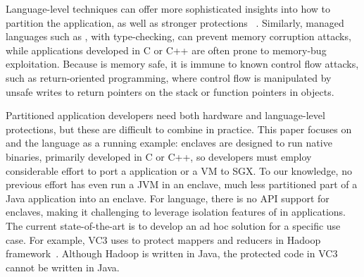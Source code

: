 Language-level techniques can offer more sophisticated insights into how
to partition the application, as well as stronger protections ~\cite{bittau2008wedge,brumley2004privtrans,khatiwala2006data}.
Similarly, managed languages such as \java{}, with type-checking,
can prevent memory corruption attacks,
while applications developed in C or C++ are often prone to memory-bug exploitation.  
Because \java{} is memory safe, it is immune to known control flow attacks, such as return-oriented programming,
where control flow is manipulated by unsafe writes to return pointers on the stack or function pointers in objects.


Partitioned application developers need both hardware and language-level protections,
but these are difficult to combine in practice.
This paper focuses on \sgx{} and the \java{} language as a running example:
\sgx{} enclaves are designed to run native binaries, primarily developed in C or C++,
so developers must employ considerable effort to port a \java{} application or a \java{} VM to SGX.
To our knowledge, no previous effort has even run a JVM in an enclave, much less partitioned part of a Java application into an enclave.
For \java{} language, there is no API support for \sgx{} enclaves,
making it challenging to leverage isolation features of \sgx{}
in \java{} applications. 
The current  state-of-the-art is to develop an ad hoc solution for 
a specific use case.
For example, VC3 uses \sgx{} to protect mappers and reducers in Hadoop framework~\cite{vc3}.
Although Hadoop is written in Java, the protected code in VC3 cannot be written in Java.

